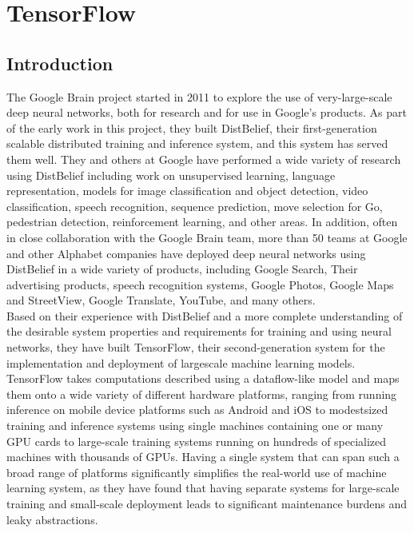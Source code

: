 \section{TensorFlow}
\label{chap:TensorFlow}

  \subsection{Introduction}
    The Google Brain project started in 2011 to explore the use of very-large-scale deep neural networks, both for research and for use in Google’s products. As part of the early work in this project, they built DistBelief, their first-generation scalable distributed training and inference system, and this system has served them well. They and others at Google have performed a wide variety of research using DistBelief including work on unsupervised learning, language representation, models for image classification and object detection, video classification, speech recognition, sequence prediction, move selection for Go, pedestrian detection, reinforcement learning, and other areas. In addition, often in close collaboration with the Google Brain team, more than 50 teams at Google and other Alphabet companies have deployed deep neural networks using DistBelief in a wide variety of products, including Google Search, Their advertising products, speech recognition systems, Google Photos, Google Maps and StreetView, Google Translate, YouTube, and many others.\\
    Based on their experience with DistBelief and a more complete understanding of the desirable system properties and requirements for training and using neural networks, they have built TensorFlow, their second-generation system for the implementation and deployment of largescale machine learning models. TensorFlow takes computations described using a dataflow-like model and maps them onto a wide variety of different hardware platforms, ranging from running inference on mobile device platforms such as Android and iOS to modestsized training and inference systems using single machines containing one or many GPU cards to large-scale training systems running on hundreds of specialized machines with thousands of GPUs. Having a single system that can span such a broad range of platforms significantly simplifies the real-world use of machine learning system, as they have found that having separate systems for large-scale training and small-scale deployment leads to significant maintenance burdens and leaky abstractions.\\
